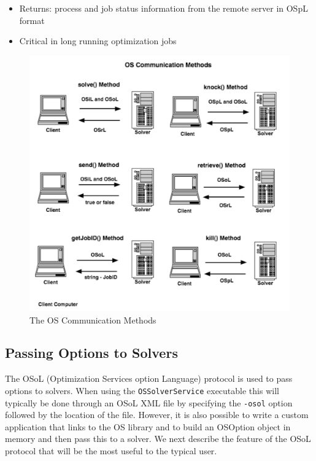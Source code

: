 \documentclass[11pt]{article}
\newcommand{\figurepath}{./figures}
\renewcommand{\_}{{\char"5F}}
\renewcommand{\{}{{\char"7B}}
\renewcommand{\}}{{\char"7D}}
\renewcommand{\^}{{\char"0D}}
\renewcommand{\'}{{\char"0D}}
\begin{document}
\begin{enumerate}[Step 1:]
\begin{itemize}
\begin{itemize}
\item Returns: process and job status information from the remote server in OSpL format

\item Critical in long running optimization jobs

\end{itemize}

\end{itemize}


\begin{figure}[ht]
\centering
\includegraphics[scale=0.5]{./figures/osCommunicationMethods.pdf}
\caption{The OS Communication Methods}
\label{figure:osCommunicationMethods}
\end{figure}


\subsection{Passing Options to Solvers}

The OSoL (Optimization Services option Language) protocol is used to pass options to solvers.   
When using the {\tt OSSolverService} executable this will typically be done through an OSoL XML file 
by specifying the {\tt -osol} option followed by the location of the file.  However, it is also possible 
to write a custom application that links to the OS library and to build an OSOption object in memory 
and then pass this to a solver. We next describe the  feature of the OSoL protocol that will be the most 
useful to the typical user.


\end{enumerate}
\end{document}
